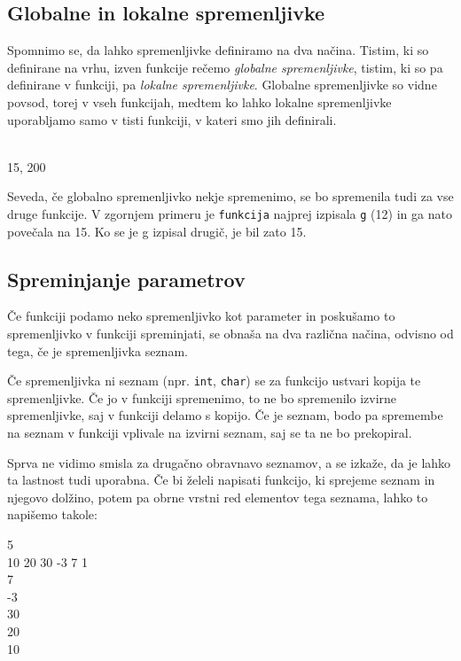 \documentclass{book}
\begin{document}
\subsection{Globalne in lokalne spremenljivke}

Spomnimo se, da lahko spremenljivke definiramo na dva načina. Tistim, ki so
definirane na vrhu, izven funkcije rečemo \emph{globalne spremenljivke},
tistim, ki so pa definirane v funkciji, pa \emph{lokalne spremenljivke}.
Globalne spremenljivke so vidne povsod, torej v vseh funkcijah, medtem ko lahko
lokalne spremenljivke uporabljamo samo v tisti funkciji, v kateri smo jih definirali.

\newpage
\begin{examples}

    \begin{inout}
         \\
        15, 200
    \end{inout}

\end{examples}

Seveda, če globalno spremenljivko nekje spremenimo, se bo spremenila tudi za
vse druge funkcije. V zgornjem primeru je \verb+funkcija+ najprej izpisala
\verb+g+ (12) in ga nato povečala na 15. Ko se je g izpisal drugič, je bil zato
15.

\subsection{Spreminjanje parametrov}

Če funkciji podamo neko spremenljivko kot
parameter in poskušamo to spremenljivko v funkciji spreminjati, se obnaša na
dva različna načina, odvisno od tega, če je spremenljivka seznam.

Če spremenljivka ni seznam (npr. \verb+int+, \verb+char+) se za funkcijo
ustvari kopija te spremenljivke. Če jo v funkciji spremenimo, to ne bo
spremenilo izvirne spremenljivke, saj v funkciji delamo s kopijo. Če je seznam,
bodo pa spremembe na seznam v funkciji vplivale na izvirni seznam, saj se ta ne
bo prekopiral.

\newpage
\begin{examples}
  Sprva ne vidimo smisla za drugačno obravnavo seznamov, a se izkaže, da je
  lahko ta lastnost tudi uporabna. Če bi želeli napisati funkcijo, ki sprejeme
  seznam in njegovo dolžino, potem pa obrne vrstni red elementov tega seznama,
  lahko to napišemo takole:


  \begin{inout}
    5 \\
    10 20 30 -3 7 1
     \\ 7 \\ -3 \\ 30 \\ 20 \\ 10 \\
  \end{inout}

\end{examples}
\end{document}
